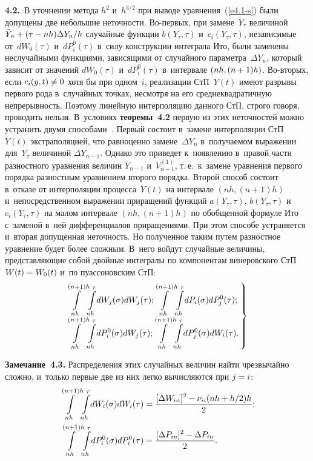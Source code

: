 \begin{multicols}{2}
\textbf{4.2.}\ В уточнении метода $h^2$ и~$h^{3/2}$ при выводе уравнения~(\ref{e4.1-s}) были 
допущены две небольшие неточности.
Во-пер\-вых, при замене~$\bar Y_{\tau}$ величиной $\bar Y_n\hm+(\tau\hm-nh)\Delta
Y_n/h$ случайные функции $b(Y_{\tau},\tau)$ и~$c_i(Y_{\tau},\tau )$,
независимые от~$dW_0(\tau)$ и~$dP_i^0(\tau)$ в~силу конструкции
интеграла Ито, были заменены неслучайными функциями, зависящими от
случайного параметра~$\Delta Y_n$, который зависит от значений
$dW_0(\tau)$ и~$dP_i^0(\tau)$ в~интервале $(nh,(n\hm+1)h)$. Во-вто\-рых,
если
$c_i(y,t)\hm\ne 0$ хотя бы при одном~$i$, реализации СтП~$Y(t)$ имеют разрывы первого рода в~случайных точках, несмотря на его
среднеквадратичную непрерывность. Поэтому линейную интерполяцию
данного СтП, строго говоря, проводить нельзя. В~условиях \textbf{теоремы~4.2} 
первую из этих
неточностей можно устранить двумя способами~\cite{11-s, 12-s}. Первый состоит в~замене
интерполяции СтП~$Y(t)$ экстраполяцией, что равноценно замене~$\Delta Y_n$ в~получаемом выражении для~$Y_{\tau}$ величиной $\Delta
Y_{n-1}$. Однако это приведет к~появлению в~правой части разностного
уравнения величин $\bar Y_{n-1}$ и~$V_{n-1}^{(1)}$, т.\,е.\ к~замене
уравнения первого порядка разностным уравнением второго порядка.
Второй способ состоит в~отказе от интерполяции процесса~$Y(t)$ на
интервале $(nh,(n+1)h)$ и~непосредственном выражении приращений
функций $a(Y_{\tau},\tau)$, $b(Y_{\tau},\tau)$ и~$c_i(Y_{\tau},\tau)$
на малом интервале $(nh,(n+1)h)$ по обобщенной формуле Ито с~заменой в~ней дифференциалов приращениями. При этом способе устраняется и~вторая
допущенная неточность. Но полученное таким путем разностное уравнение
будет более сложным. В~него войдут случайные величины, представляющие
собой двойные интегралы по компонентам винеровского СтП $W(t)\hm=W_0(t)$ и~по пуассоновским СтП:
\begin{equation}
\left.
\begin{array}{l}
\hspace*{-3.8mm}\displaystyle \inh \!\int\limits_{nh}^{\tau}\!dW_j(\sigma)dW_j(\tau); \!
\displaystyle  \inh \!\int\limits_{nh}^{\tau}\!dP_i(\sigma)dP_j^0(\tau);\\[6pt]
\hspace*{-3.8mm}\displaystyle    \inh\! \int\limits_{nh}^{\tau}\!dP_i^0(\sigma)dW_j(\tau);\!
\displaystyle  \inh\! \int\limits_{nh}^{\tau}\!dP_j^0(\sigma)dW_i(\tau). 
\end{array}\!\!
\right\}\!\!
\label{e4.18-s}
    \end{equation}

\noindent
\textbf{Замечание~4.3.}
Распределения этих случайных величин найти чрезвычайно сложно, и~только первые две из них легко вычисляются при $j\hm=i$:
   \begin{align*}
    \int\limits_{nh}^{(n+1)h} \!\int\limits_{nh}^{\tau}\!dW_i(\sigma)dW_i(\tau)&=
    \displaystyle\frac{\displaystyle [\Delta W_{{in}}]^2-\nu_{ii}(nh+h/2)h\mathstrut}{\displaystyle 2\mathstrut};
   \\
    \int\limits_{nh}^{(n+1)h} \!\int\limits_{nh}^{\tau}\!dP_i^0(\sigma)dP_i^0(\tau)&=
    \displaystyle\frac{\displaystyle [\Delta P_{{in}}]^2-\Delta P_{{in}}\mathstrut}{\displaystyle 2\mathstrut}. 
   \end{align*}



\end{multicols}
